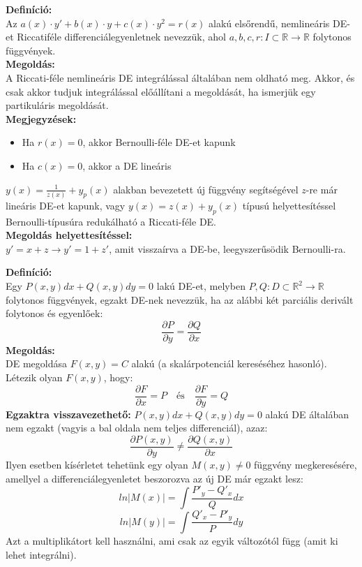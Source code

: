 \documentclass[11pt,a4paper]{article}
\begin{document}
    \begin{tcolorbox}[colback=red!5!white,colframe=red!60!black,title= 3. Riccati-féle DE]
        \textbf{Definíció:} \\
        Az $a(x) \cdot y' + b(x) \cdot y + c(x) \cdot y^2 = r(x)$ alakú elsőrendű, nemlineáris DE-et Riccatiféle
        differenciálegyenletnek nevezzük, ahol $a, b, c, r: I \subset \mathbb{R} \rightarrow \mathbb{R}$ folytonos függvények. \\
        \textbf{Megoldás:} \\
        A Riccati-féle nemlineáris DE integrálással általában nem oldható meg. Akkor, és csak akkor tudjuk integrálással előállítani a megoldását, ha ismerjük egy partikuláris megoldását. \\
        \textbf{Megjegyzések:}
        \begin{itemize}
            \item Ha $r(x) = 0$, akkor Bernoulli-féle DE-et kapunk
            \item Ha $c(x) = 0$, akkor a DE lineáris
        \end{itemize}
        $y(x) = \frac{1}{z(x)} + y_p(x)$ alakban bevezetett új függvény segítségével $z$-re már lineáris DE-et kapunk, vagy $y(x) =  z(x) + y_p(x)$ típusú helyettesítéssel Bernoulli-típusúra redukálható a Riccati-féle DE. \\
        \textbf{Megoldás helyettesítéssel:} \\
        $y' = x + z \rightarrow y' = 1 + z'$, amit visszaírva a DE-be, leegyszerűsödik Bernoulli-ra.
    \end{tcolorbox}

    \begin{tcolorbox}[colback=red!5!white,colframe=red!60!black,title= 4. Egzakt DE]
        \textbf{Definíció:} \\
        Egy $P(x, y)dx + Q(x, y)dy = 0$ lakú DE-et, melyben $P, Q: D \subset \mathbb{R}^2 \rightarrow \mathbb{R}$ folytonos függvények, egzakt DE-nek nevezzük, ha az alábbi két parciális derivált folytonos és egyenlőek:
        $$\dfrac{\partial P}{\partial y} = \dfrac{\partial Q}{\partial x}$$
        \textbf{Megoldás:} \\
        DE megoldása $F(x, y) = C$ alakú (a skalárpotenciál kereséséhez hasonló). Létezik olyan $F(x, y)$, hogy:
        $$\dfrac{\partial F}{\partial x} = P \quad \text{és} \quad \dfrac{\partial F}{\partial y} = Q$$
        \textbf{Egzaktra visszavezethető:} $P(x, y)dx + Q(x, y)dy = 0$ alakú DE általában nem egzakt (vagyis a bal oldala nem teljes differenciál), azaz:
        $$\dfrac{\partial P(x, y)}{\partial y} \neq \dfrac{\partial Q(x, y)}{\partial x}$$
        Ilyen esetben kísérletet tehetünk egy olyan $M(x, y) \neq 0$ függvény megkeresésére, amellyel a differenciálegyenletet beszorozva az új DE már egzakt lesz:
        $$ln\left|M(x)\right| = \int \dfrac{P'_y-Q'_x}{Q}dx$$
        $$ln\left|M(y)\right| = \int \dfrac{Q'_x-P'_y}{P}dy$$
        Azt a multiplikátort kell használni, ami csak az egyik változótól függ (amit ki lehet integrálni).
    \end{tcolorbox}
\end{document}
